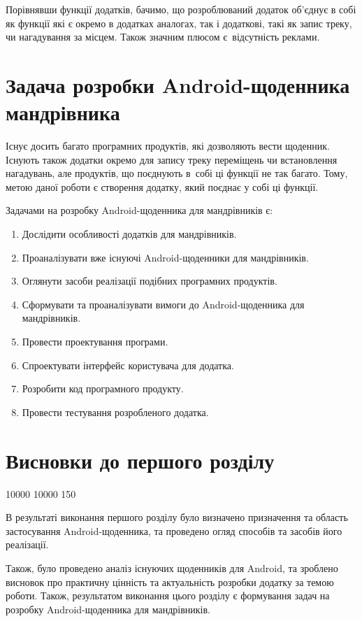 \documentclass[../main.tex]{subfiles}
\begin{document}
{Порівнявши функції додатків, бачимо, що розроблюваний додаток об'єднує в собі як функції які є окремо в додатках аналогах, так і додаткові, такі як запис треку, чи нагадування за місцем. Також значним плюсом є~відсутність реклами.

}

\section{Задача розробки Android-щоденника мандрівника}

Існує досить багато програмних продуктів, які дозволяють вести щоденник. Існують також додатки окремо для запису треку переміщень чи встановлення нагадувань, але продуктів, що поєднують в~собі ці функції не так багато. Тому, метою даної роботи є створення додатку, який поєднає у собі ці функції. 

Задачами на розробку Android-щоденника для мандрівників є:
\begin{enumerate}
	\item Дослідити особливості додатків для мандрівників.
	\item Проаналізувати вже існуючі Android-щоденники для мандрівників.
	\item Оглянути засоби реалізації подібних програмних продуктів.
	\item Сформувати та проаналізувати вимоги до Android-щоденника для мандрівників.
	\item Провести проектування програми.
	\item Спроектувати інтерфейс користувача для додатка.
	\item Розробити код програмного продукту.
	\item Провести тестування розробленого додатка.
\end{enumerate}

\section{Висновки до першого розділу}

{
 10000 10000 150  %

В результаті виконання першого розділу було визначено призначення та область застосування Android-щоденника, та проведено огляд способів та засобів його реалізації. 

Також, було проведено аналіз існуючих щоденників для Android, та зроблено висновок про практичну цінність та актуальність розробки додатку за темою роботи. Також, результатом виконання цього розділу є формування задач на розробку Android-щоденника для мандрівників. 

}
\end{document}
